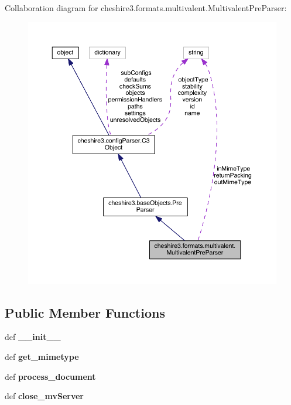 Collaboration diagram for cheshire3.\-formats.\-multivalent.\-Multivalent\-Pre\-Parser\-:
\nopagebreak
\begin{figure}[H]
\begin{center}
\leavevmode
\includegraphics[width=350pt]{classcheshire3_1_1formats_1_1multivalent_1_1_multivalent_pre_parser__coll__graph}
\end{center}
\end{figure}
\subsection*{Public Member Functions}
\begin{DoxyCompactItemize}
\item 
\hypertarget{classcheshire3_1_1formats_1_1multivalent_1_1_multivalent_pre_parser_ad98c0d185981eeb4a0f7f9439f8af9ad}{def {\bfseries \-\_\-\-\_\-init\-\_\-\-\_\-}}\label{classcheshire3_1_1formats_1_1multivalent_1_1_multivalent_pre_parser_ad98c0d185981eeb4a0f7f9439f8af9ad}

\item 
\hypertarget{classcheshire3_1_1formats_1_1multivalent_1_1_multivalent_pre_parser_a46fdb876551ae5617da3e00b4d8df17d}{def {\bfseries get\-\_\-mimetype}}\label{classcheshire3_1_1formats_1_1multivalent_1_1_multivalent_pre_parser_a46fdb876551ae5617da3e00b4d8df17d}

\item 
\hypertarget{classcheshire3_1_1formats_1_1multivalent_1_1_multivalent_pre_parser_a6fc6c281582d0db326731403be1cb39a}{def {\bfseries process\-\_\-document}}\label{classcheshire3_1_1formats_1_1multivalent_1_1_multivalent_pre_parser_a6fc6c281582d0db326731403be1cb39a}

\item 
\hypertarget{classcheshire3_1_1formats_1_1multivalent_1_1_multivalent_pre_parser_ab7abe4795b2b42949d35c9fbe35109fd}{def {\bfseries close\-\_\-mv\-Server}}\label{classcheshire3_1_1formats_1_1multivalent_1_1_multivalent_pre_parser_ab7abe4795b2b42949d35c9fbe35109fd}

\end{DoxyCompactItemize}
